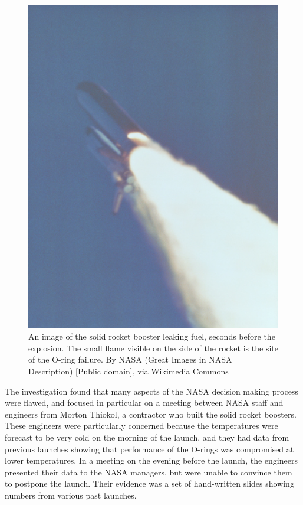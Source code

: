 \documentclass[
  12pt,
]{book}
\begin{document}
\begin{figure}
\includegraphics[width=5in,height=0.2\textheight]{images/Booster_Rocket_Breach_-_GPN-2000-001425} \caption{An image of the solid rocket booster leaking fuel, seconds before the explosion. The small flame visible on the side of the rocket is the site of the O-ring failure. By NASA (Great Images in NASA Description) [Public domain], via Wikimedia Commons}\label{fig:srbLeak}
\end{figure}

The investigation found that many aspects of the NASA decision making process were flawed, and focused in particular on a meeting between NASA staff and engineers from Morton Thiokol, a contractor who built the solid rocket boosters. These engineers were particularly concerned because the temperatures were forecast to be very cold on the morning of the launch, and they had data from previous launches showing that performance of the O-rings was compromised at lower temperatures. In a meeting on the evening before the launch, the engineers presented their data to the NASA managers, but were unable to convince them to postpone the launch. Their evidence was a set of hand-written slides showing numbers from various past launches.
\end{document}
